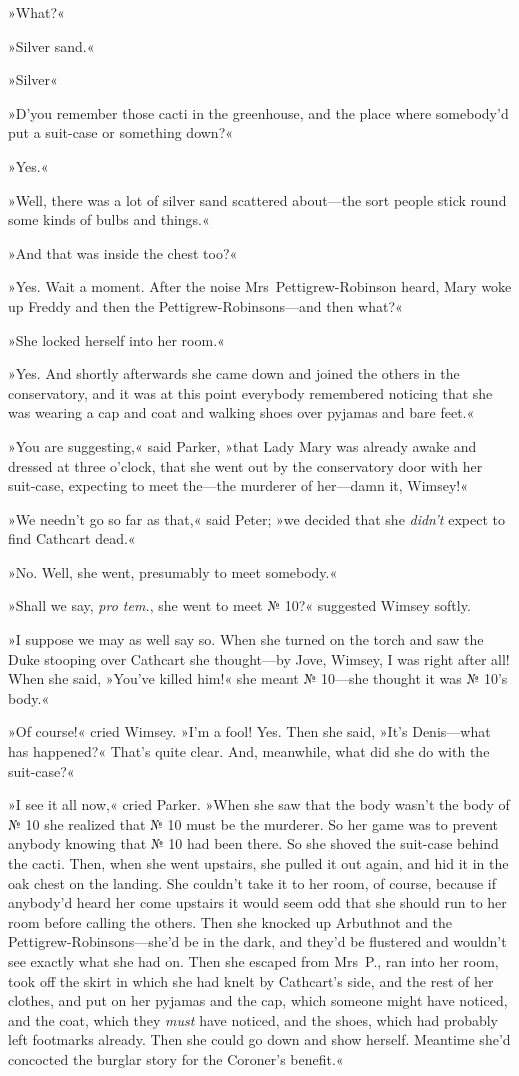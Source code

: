 »What?«

»Silver sand.«

»Silver\longdash«

»D'you remember those cacti in the greenhouse, and the place where somebody'd put a suit-case or something down?«

»Yes.«

»Well, there was a lot of silver sand scattered about—the sort people stick round some kinds of bulbs and things.«

»And that was inside the chest too?«

»Yes. Wait a moment. After the noise Mrs~Pettigrew-Robinson heard, Mary woke up Freddy and then the Pettigrew-Robinsons—and then what?«

»She locked herself into her room.«

»Yes. And shortly afterwards she came down and joined the others in the conservatory, and it was at this point everybody remembered noticing that she was wearing a cap and coat and walking shoes over pyjamas and bare feet.«

»You are suggesting,« said Parker, »that Lady Mary was already awake and dressed at three o'clock, that she went out by the conservatory door with her suit-case, expecting to meet the—the murderer of her—damn it, Wimsey!«

»We needn't go so far as that,« said Peter; »we decided that she \textit{didn't} expect to find Cathcart dead.«

»No. Well, she went, presumably to meet somebody.«

»Shall we say, \textit{pro tem.}, she went to meet № 10?« suggested Wimsey softly.

»I suppose we may as well say so. When she turned on the torch and saw the Duke stooping over Cathcart she thought—by Jove, Wimsey, I was right after all! When she said, »You've killed him!« she meant № 10—she thought it was № 10's body.«

»Of course!« cried Wimsey. »I'm a fool! Yes. Then she said, »It's Denis—what has happened?« That's quite clear. And, meanwhile, what did she do with the suit-case?«

»I see it all now,« cried Parker. »When she saw that the body wasn't the body of № 10 she realized that № 10 must be the murderer. So her game was to prevent anybody knowing that № 10 had been there.  So she shoved the suit-case behind the cacti. Then, when she went upstairs, she pulled it out again, and hid it in the oak chest on the landing. She couldn't take it to her room, of course, because if anybody'd heard her come upstairs it would seem odd that she should run to her room before calling the others. Then she knocked up Arbuthnot and the Pettigrew-Robinsons—she'd be in the dark, and they'd be flustered and wouldn't see exactly what she had on. Then she escaped from Mrs~P., ran into her room, took off the skirt in which she had knelt by Cathcart's side, and the rest of her clothes, and put on her pyjamas and the cap, which someone might have noticed, and the coat, which they \textit{must} have noticed, and the shoes, which had probably left footmarks already. Then she could go down and show herself. Meantime she'd concocted the burglar story for the Coroner's benefit.«

